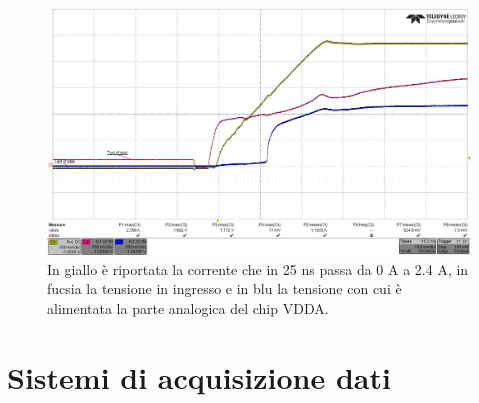 \begin{figure}
\centering
\includegraphics[scale=.3]{Immagini/rd-powup-dir7}
\caption{In giallo è riportata la corrente che in 25 ns passa da 0 A a 2.4 A, in fucsia la tensione in ingresso e in blu la tensione con cui è alimentata la parte analogica del chip VDDA.}
\label{rd-powup-dir7}
\end{figure}


\section{Sistemi di acquisizione dati}


